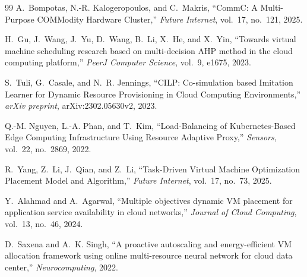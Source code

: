 \documentclass[12pt,a4paper]{report}
\begin{document}
\begin{thebibliography}{99}
A.~Bompotas, N.-R. Kalogeropoulos, and C.~Makris, ``CommC: A Multi-Purpose COMModity
Hardware Cluster,'' \textit{Future Internet}, vol.~17, no.~121, 2025.

H.~Gu, J.~Wang, J.~Yu, D.~Wang, B.~Li, X.~He, and X.~Yin, ``Towards virtual machine
scheduling research based on multi-decision AHP method in the cloud computing
platform,'' \textit{PeerJ Computer Science}, vol.~9, e1675, 2023.

S.~Tuli, G.~Casale, and N.~R. Jennings, ``CILP: Co-simulation based Imitation Learner
for Dynamic Resource Provisioning in Cloud Computing Environments,'' \textit{arXiv
preprint}, arXiv:2302.05630v2, 2023.

Q.-M. Nguyen, L.-A. Phan, and T.~Kim, ``Load-Balancing of Kubernetes-Based Edge
Computing Infrastructure Using Resource Adaptive Proxy,'' \textit{Sensors}, vol.~22,
no.~2869, 2022.

R.~Yang, Z.~Li, J.~Qian, and Z.~Li, ``Task-Driven Virtual Machine Optimization
Placement Model and Algorithm,'' \textit{Future Internet}, vol.~17, no.~73, 2025.

Y.~Alahmad and A.~Agarwal, ``Multiple objectives dynamic VM placement for application
service availability in cloud networks,'' \textit{Journal of Cloud Computing}, vol.~13,
no.~46, 2024.

D.~Saxena and A.~K. Singh, ``A proactive autoscaling and energy-efficient VM allocation
framework using online multi-resource neural network for cloud data center,''
\textit{Neurocomputing}, 2022.

\end{thebibliography}
\end{document}
